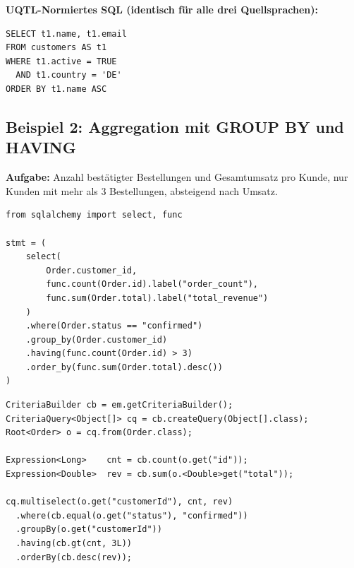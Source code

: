 \begin{successbox}
\textbf{UQTL-Normiertes SQL (identisch für alle drei Quellsprachen):}
\begin{lstlisting}[style=sqlstyle, numbers=none]
SELECT t1.name, t1.email
FROM customers AS t1
WHERE t1.active = TRUE
  AND t1.country = 'DE'
ORDER BY t1.name ASC
\end{lstlisting}
\end{successbox}

\subsection{Beispiel 2: Aggregation mit GROUP BY und HAVING}
\label{subsec:bsp2}

\textbf{Aufgabe:} Anzahl bestätigter Bestellungen und Gesamtumsatz pro Kunde,
nur Kunden mit mehr als 3 Bestellungen, absteigend nach Umsatz.

\begin{lstlisting}[style=pythonstyle, caption={Beispiel 2 -- Python},
  label=lst:bsp2_py]
from sqlalchemy import select, func

stmt = (
    select(
        Order.customer_id,
        func.count(Order.id).label("order_count"),
        func.sum(Order.total).label("total_revenue")
    )
    .where(Order.status == "confirmed")
    .group_by(Order.customer_id)
    .having(func.count(Order.id) > 3)
    .order_by(func.sum(Order.total).desc())
)
\end{lstlisting}

\begin{lstlisting}[style=javastyle, caption={Beispiel 2 -- Java},
  label=lst:bsp2_java]
CriteriaBuilder cb = em.getCriteriaBuilder();
CriteriaQuery<Object[]> cq = cb.createQuery(Object[].class);
Root<Order> o = cq.from(Order.class);

Expression<Long>    cnt = cb.count(o.get("id"));
Expression<Double>  rev = cb.sum(o.<Double>get("total"));

cq.multiselect(o.get("customerId"), cnt, rev)
  .where(cb.equal(o.get("status"), "confirmed"))
  .groupBy(o.get("customerId"))
  .having(cb.gt(cnt, 3L))
  .orderBy(cb.desc(rev));
\end{lstlisting}

